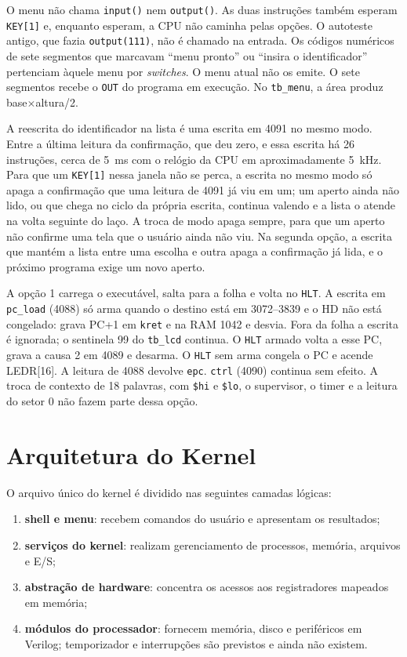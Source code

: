 \documentclass[
    12pt,
    openright,
    a4paper,
    english,
    brazilian
]{abntex2}
\begin{document}
O menu não chama \texttt{input()} nem \texttt{output()}. As duas instruções também esperam \texttt{KEY[1]} e, enquanto esperam, a CPU não caminha pelas opções. O autoteste antigo, que fazia \texttt{output(111)}, não é chamado na entrada. Os códigos numéricos de sete segmentos que marcavam ``menu pronto'' ou ``insira o identificador'' pertenciam àquele menu por \emph{switches}. O menu atual não os emite. O sete segmentos recebe o \texttt{OUT} do programa em execução. No \texttt{tb\_menu}, a área produz base$\times$altura/2.

A reescrita do identificador na lista é uma escrita em 4091 no mesmo modo. Entre a última leitura da confirmação, que deu zero, e essa escrita há 26 instruções, cerca de 5~ms com o relógio da CPU em aproximadamente 5~kHz. Para que um \texttt{KEY[1]} nessa janela não se perca, a escrita no mesmo modo só apaga a confirmação que uma leitura de 4091 já viu em um; um aperto ainda não lido, ou que chega no ciclo da própria escrita, continua valendo e a lista o atende na volta seguinte do laço. A troca de modo apaga sempre, para que um aperto não confirme uma tela que o usuário ainda não viu. Na segunda opção, a escrita que mantém a lista entre uma escolha e outra apaga a confirmação já lida, e o próximo programa exige um novo aperto.

A opção 1 carrega o executável, salta para a folha e volta no \texttt{HLT}. A escrita em \texttt{pc\_load} (4088) só arma quando o destino está em 3072--3839 e o HD não está congelado: grava PC+1 em \texttt{kret} e na RAM 1042 e desvia. Fora da folha a escrita é ignorada; o sentinela 99 do \texttt{tb\_lcd} continua. O \texttt{HLT} armado volta a esse PC, grava a causa 2 em 4089 e desarma. O \texttt{HLT} sem arma congela o PC e acende LEDR[16]. A leitura de 4088 devolve \texttt{epc}. \texttt{ctrl} (4090) continua sem efeito. A troca de contexto de 18 palavras, com \texttt{\$hi} e \texttt{\$lo}, o supervisor, o timer e a leitura do setor 0 não fazem parte dessa opção.

\section{Arquitetura do Kernel}

O arquivo único do kernel é dividido nas seguintes camadas lógicas:

\begin{enumerate}
    \item \textbf{shell e menu}: recebem comandos do usuário e apresentam os resultados;
    \item \textbf{serviços do kernel}: realizam gerenciamento de processos, memória, arquivos e E/S;
    \item \textbf{abstração de hardware}: concentra os acessos aos registradores mapeados em memória;
    \item \textbf{módulos do processador}: fornecem memória, disco e periféricos em Verilog; temporizador e interrupções são previstos e ainda não existem.
\end{enumerate}
\end{document}
